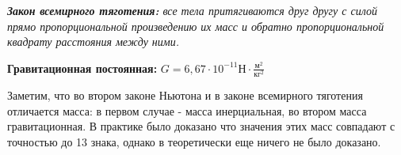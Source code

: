 \vspace{5px}

\textit{\textbf{Закон всемирного тяготения: }все тела притягиваются друг другу с силой прямо пропорциональной произведению их масс и обратно пропорциональной квадрату расстояния между ними.}

\vspace{5px}

\textbf{Гравитационная постоянная: }$G = 6,67 \cdot 10^{-11} \text{Н} \cdot \frac{\text{м}^2}{\text{кг}^2}$

\vspace{5px}

Заметим, что во втором законе Ньютона и в законе всемирного тяготения отличается масса: в первом случае - масса инерциальная, во втором масса гравитационная. В практике было доказано что значения этих масс совпадают с точностью до 13 знака, однако в теоретически еще ничего не было доказано.
